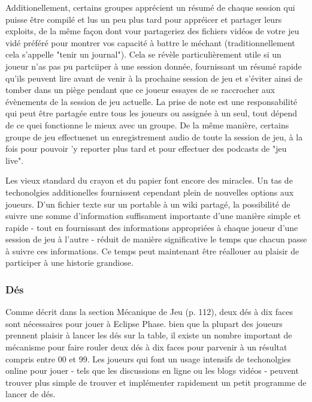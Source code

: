 Additionellement, certains groupes apprécient un résumé de chaque session qui puisse être compilé et lus un peu plus tard pour appréicer et partager leurs exploits, de la même façon dont vour partageriez des fichiers vidéos de votre jeu vidé préféré pour montrer vos capacité à battre le méchant (traditionnellement cela s'appelle "tenir un journal"). Cela se révèle particulièrement utile si un joueur n'as pas pu partciiper à une session donnée, fournissant un résumé rapide qu'ils peuvent lire avant de venir à la prochaine session de jeu et s'éviter ainsi de tomber dans un piège pendant que ce joueur essayes de se raccrocher aux évènements de la session de jeu actuelle. La prise de note est une responsabilité qui peut être partagée entre tous les joueurs ou assignée à un seul, tout dépend de ce quei fonctionne le mieux avec un groupe. De la même manière, certains groupe de jeu effectuenet un enregistrement audio de toute la session de jeu, à la fois pour pouvoir 'y reporter plus tard et pour effectuer des podcasts de "jeu live". 

Les vieux standard du crayon et du papier font encore des miracles. Un tas de techonolgies additionelles fournissent cependant plein de nouvelles options aux joueurs. D'un fichier texte sur un portable à un wiki partagé, la possibilité de suivre une somme d'information suffisament importante d'une manière simple et rapide - tout en fournissant des informations appropriées à chaque joueur d'une session de jeu à l'autre - réduit de manière significative le temps que chacun passe à suivre ces informations. Ce temps peut maintenant être réallouer au plaisir de participer à une historie grandiose. 



\subsubsection{Dés} \label{sec:dice} 

Comme décrit dans la section Mécanique de Jeu (p. 112), deux dés à dix faces sont nécessaires pour jouer à Eclipse Phase. bien que la plupart des joueurs prennent plaisir à lancer les dés sur la table, il existe un nombre important de mécanisme pour faire rouler deux dés à dix faces pour parvenir à un résultat compris entre 00 et 99. Les joueurs qui font un usage intensifs de techonolgies online pour jouer - tels que les discussions en ligne ou les blogs vidéos - peuvent trouver plus simple de trouver et implémenter rapidement un petit programme de lancer de dés. 



